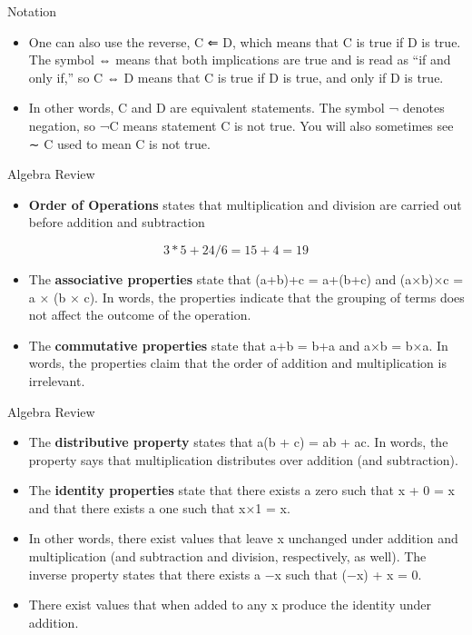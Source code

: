 \documentclass[
  ignorenonframetext,
]{beamer}
\providecommand{\tightlist}{%
  \setlength{\itemsep}{0pt}\setlength{\parskip}{0pt}}
\begin{document}
\begin{frame}{Notation}
\protect\hypertarget{notation-7}{}

\begin{itemize}
\item
  One can also use the reverse, C ⇐ D, which means that C is true if D
  is true. The symbol ⇔ means that both implications are true and is
  read as ``if and only if,'' so C ⇔ D means that C is true if D is
  true, and only if D is true.
\item
  In other words, C and D are equivalent statements. The symbol ¬
  denotes negation, so ¬C means statement C is not true. You will also
  sometimes see ∼ C used to mean C is not true.
\end{itemize}

\end{frame}

\begin{frame}{Algebra Review}
\protect\hypertarget{algebra-review}{}

\begin{itemize}
\tightlist
\item
  \textbf{Order of Operations} states that multiplication and division
  are carried out before addition and subtraction
\end{itemize}

\[3*5 + 24/6 = 15 + 4 = 19\]

\begin{itemize}
\item
  The \textbf{associative properties} state that (a+b)+c = a+(b+c) and
  (a×b)×c = a × (b × c). In words, the properties indicate that the
  grouping of terms does not affect the outcome of the operation.
\item
  The \textbf{commutative properties} state that a+b = b+a and a×b =
  b×a. In words, the properties claim that the order of addition and
  multiplication is irrelevant.
\end{itemize}

\end{frame}

\begin{frame}{Algebra Review}
\protect\hypertarget{algebra-review-1}{}

\begin{itemize}
\item
  The \textbf{distributive property} states that a(b + c) = ab + ac. In
  words, the property says that multiplication distributes over addition
  (and subtraction).
\item
  The \textbf{identity properties} state that there exists a zero such
  that x + 0 = x and that there exists a one such that x×1 = x.
\item
  In other words, there exist values that leave x unchanged under
  addition and multiplication (and subtraction and division,
  respectively, as well). The inverse property states that there exists
  a −x such that (−x) + x = 0.
\item
  There exist values that when added to any x produce the identity under
  addition.
\end{itemize}

\end{frame}
\end{document}

